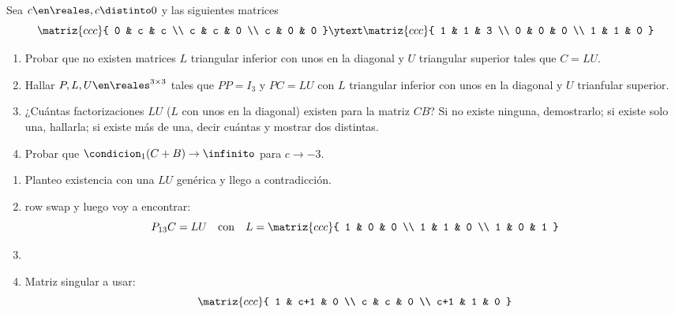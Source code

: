 \begin{enunciado}{\ejExtra}
  Sea $c \en \reales, c \distinto 0$ y las siguientes matrices
  $$
    \matriz{ccc}{
      0 & c & c \\
      c & c & 0 \\
      c & 0 & 0
    }
    \ytext
    \matriz{ccc}{
      1 & 1 & 3 \\
      0 & 0 & 0 \\
      1 & 1 & 0
    }
  $$
  \begin{enumerate}[label=\alph*)]
    \item Probar que no existen matrices $L$ triangular inferior con unos en la diagonal y $U$
          triangular superior tales que $C = LU$.

    \item Hallar $P, L, U \en \reales^{3 \times 3}$ tales que $PP = I_3$ y $PC = LU$ con $L$ triangular inferior con unos
          en la diagonal y $U$ trianfular superior.

    \item ¿Cuántas factorizaciones $LU$ ($L$ con unos en la diagonal) existen para la matriz $CB$?
          Si no existe ninguna, demostrarlo; si existe solo una, hallarla; si existe más de una, decir cuántas y mostrar dos distintas.

    \item Probar que $\condicion_1(C+B) \to \infinito$ para $c \to -3$.
  \end{enumerate}
\end{enunciado}

\begin{enumerate}[label=\alph*)]
  \item Planteo existencia con una $LU$ genérica y llego a contradicción.
  \item row swap y luego voy a encontrar:
        $$
          P_{13} C = LU
          \quad
          \text{con}
          \quad
          L  =
          \matriz{ccc}{
            1 & 0 & 0 \\
            1 & 1 & 0 \\
            1 & 0 & 1
          }
        $$
  \item \hacer
  \item Matriz singular a usar:
        $$
          \matriz{ccc}{
            1 & c+1 & 0 \\
            c & c & 0 \\
            c+1 & 1 & 0
          }
        $$
\end{enumerate}

